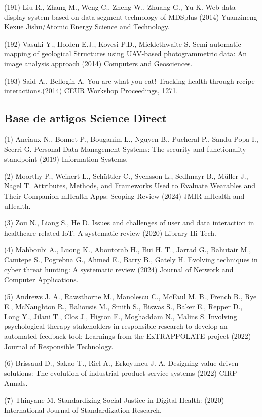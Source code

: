 \documentclass[
	12pt,				%
	oneside,			%
	a4paper,			%
	english,			%
	brazil				%
	]{abntex2ppgsi}
\begin{document}
\begin{apendicesenv}
(191) Liu R., Zhang M., Weng C., Zheng W., Zhuang G., Yu K. Web data display system based on data segment technology of MDSplus (2014) Yuanzineng Kexue Jishu/Atomic Energy Science and Technology.

(192) Vasuki Y., Holden E.J., Kovesi P.D., Micklethwaite S. Semi-automatic mapping of geological Structures using UAV-based photogrammetric data: An image analysis approach (2014) Computers and Geosciences.

(193) Said A., Bellogín A. You are what you eat! Tracking health through recipe interactions.(2014) CEUR Workshop Proceedings, 1271.


\subsection{Base de artigos Science Direct}\label{list:sciencedirect}

(1) Anciaux N., Bonnet P., Bouganim L., Nguyen B., Pucheral P., Sandu Popa I., Scerri G. Personal Data Management Systems: The security and functionality standpoint (2019) Information Systems.

(2) Moorthy P., Weinert L., Schüttler C., Svensson L., Sedlmayr B., Müller J., Nagel T. Attributes, Methods, and Frameworks Used to Evaluate Wearables and Their Companion mHealth Apps: Scoping Review (2024) JMIR mHealth and uHealth.

(3) Zou N., Liang S., He D. Issues and challenges of user and data interaction in healthcare-related IoT: A systematic review (2020) Library Hi Tech.

(4) Mahboubi A., Luong K., Aboutorab H., Bui H. T., Jarrad G., Bahutair M., Camtepe S., Pogrebna G., Ahmed E., Barry B., Gately H. Evolving techniques in cyber threat hunting: A systematic review (2024) Journal of Network and Computer Applications.

(5) Andrews J. A., Rawsthorne M., Manolescu C., McFaul M. B., French B., Rye E., McNaughton R., Baliousis M., Smith S., Biswas S., Baker E., Repper D., Long Y., Jilani T., Clos J., Higton F., Moghaddam N., Malins S. Involving psychological therapy stakeholders in responsible research to develop an automated feedback tool: Learnings from the ExTRAPPOLATE project (2022) Journal of Responsible Technology.

(6) Brissaud D., Sakao T., Riel A., Erkoyuncu J. A. Designing value-driven solutions: The evolution of industrial product-service systems (2022) CIRP Annals.

(7) Thinyane M. Standardizing Social Justice in Digital Health: (2020) International Journal of Standardization Research.


\end{apendicesenv}
\end{document}
